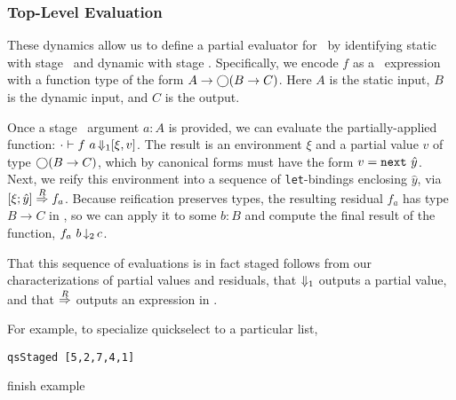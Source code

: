 \subsubsection {Top-Level Evaluation}
\label{sec:partialeval}


These dynamics allow us to define a partial evaluator for \lang\ by identifying
static with stage \bbone\ and dynamic with stage \bbtwo.  Specifically, we
encode $f$ as a \lang\ expression with a function type of the form
$A\to\bigcirc(B\to C)$.%
%
Here $A$ is the static input, $B$ is the dynamic input, and $C$ is the output.

Once a stage \bbone\ argument $a:A$ is provided, we can evaluate the partially-applied
function:
$\cdot\vdash f~a \mathop{{\Downarrow_{ 1}}} [\xi,v]$.
The result is an environment $\xi$ and a partial value $v$ of type $\bigcirc(B\to
C)$, which by canonical forms must have the form $v = {\tt next}~\hat y$. 
Next, we reify this environment into a sequence of \verb|let|-bindings
enclosing $\hat y$, via $[{\xi};{\hat y}]\overset{R}\Rightarrow{f_a}$. 
Because reification preserves types, the resulting residual $f_a$ has type $B\to C$ in \langTwo, so we can apply it to some $b:B$
and compute the final result of the function, $f_a~b \mathop{{\downarrow_{ 2}}} c$.

That this sequence of evaluations is in fact staged follows from our
characterizations of partial values and residuals, that ${\Downarrow_{ 1}}$
outputs a partial value, and that $\overset{R}\Rightarrow$ outputs an expression in \langTwo.

For example, to specialize quickselect to a particular list, 
\begin{lstlisting}
qsStaged [5,2,7,4,1]
\end{lstlisting}
\TODO finish example


